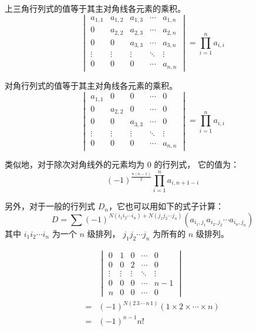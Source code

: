 \documentclass[UTF8]{article}
\newcommand \subsubsubsection [2][4mm]
{
	\vspace{#1}
	{\leftline{\heiti #2}}
	\vspace{2mm}
}
\begin{document}
	{\theorema 上三角行列式的值等于其主对角线各元素的乘积。}
	\begin{equation*}
		\begin{vmatrix}
			a_{1, 1} & a_{1, 2} & a_{1, 3} & \cdots & a_{1, n}
			\\
			0 & a_{2, 2} & a_{2, 3} & \cdots & a_{2, n}
			\\
			0 & 0 & a_{3, 3} & \cdots & a_{3, n}
			\\
			\vdots & \vdots & \vdots & \ddots & \vdots
			\\
			0 & 0 & 0 & \cdots & a_{n, n}
		\end{vmatrix}
		=
		\prod_{i = 1}^{n} a_{i, i}
	\end{equation*}

	{\theorema 对角行列式的值等于其主对角线各元素的乘积。}
	\begin{equation*}
		\begin{vmatrix}
			a_{1, 1} & 0 & 0 & \cdots & 0
			\\
			0 & a_{2, 2} & 0 & \cdots & 0
			\\
			0 & 0 & a_{3, 3} & \cdots & 0
			\\
			\vdots & \vdots & \vdots & \ddots & \vdots
			\\
			0 & 0 & 0 & \cdots & a_{n, n}
		\end{vmatrix}
		=
		\prod_{i = 1}^{n} a_{i, i}
	\end{equation*}

	\bigskip

	类似地，对于除次对角线外的元素均为 $0$ 的行列式，
	它的值为：
	$$
	(-1)^{\frac {n(n - 1)} {2}} \prod_{i = 1}^{n} a_{i, n + 1 - i}
	$$

	\bigskip

	另外，对于一般的行列式 $D_n$，它也可以用如下的式子计算：
	\begin{equation*}
		D = \sum (-1)^{N(i_1 i_2 \cdots i_n) + N(j_1 j_2 \cdots j_n)}
		(a_{i_1, j_1} a_{i_2, j_2} \cdots a_{i_n, j_n})
	\end{equation*}
	其中 $i_1 i_2 \cdots i_n$ 为一个 $n$ 级排列，
	$j_1 j_2 \cdots j_n$ 为所有的 $n$ 级排列。

	\subsubsubsection{练习}

	\newtheorem*{theoremb}{e.g}

	{}

	\begin{align*}
		&
		\begin{vmatrix}
			0 & 1 & 0 & \cdots & 0
			\\
			0 & 0 & 2 & \cdots & 0
			\\
			\vdots & \vdots & \vdots & \ddots & \vdots
			\\
			0 & 0 & 0 & \cdots & n - 1
			\\
			n & 0 & 0 & \cdots & 0
		\end{vmatrix}
		\\=&
		(-1)^{N(2 \, 3 \, \cdots \, n \, 1)} (1 \times 2 \times \cdots \times n)
		\\=&
		(-1)^{n - 1} n!
	\end{align*}
\end{document}
